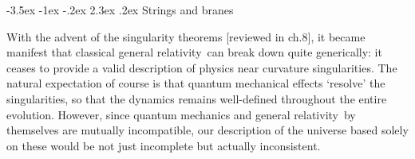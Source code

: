 \documentclass[12pt,a4paper]{article}
\makeatletter
\renewcommand\section{\@startsection {section}{1}{\z@}%
                                   {-3.5ex \@plus -1ex \@minus -.2ex}%
                                   {2.3ex \@plus.2ex}%
                                   {\normalfont\large\bfseries}}
\def\GR{general relativity}
\makeatother
\begin{document}
\section{Strings and branes}
\label{s:preAC}

With the advent of the singularity theorems [reviewed in ch.8], it became manifest that classical \GR\ can break down quite generically: it ceases to provide a valid description of physics near curvature singularities.  The natural expectation of course is that quantum mechanical effects `resolve' the singularities, so that the dynamics remains well-defined throughout the entire evolution.  
However, since quantum mechanics and \GR\ by themselves are mutually incompatible, our description of the universe based solely on these would be not just incomplete but actually inconsistent.
\end{document}
